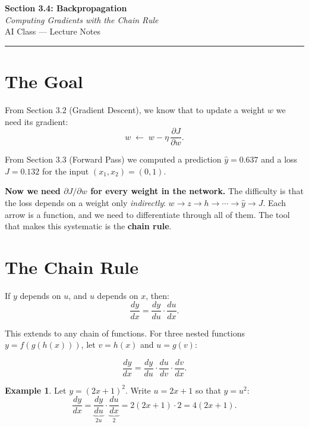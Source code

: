 \documentclass[12pt, a4paper]{article}
\newif\ifstudentmode
\newcommand{\sol}[2][6cm]{%
  \ifstudentmode
    \underline{\hspace{#1}}%
  \else
    {#2}%
  \fi
}
\theoremstyle{definition}
\newtheorem{example}{Example}[section]
\newcommand{\yhat}{\hat{y}}
\newcommand{\pd}[2]{\dfrac{\partial #1}{\partial #2}}
\begin{document}
\begin{center}
  {\LARGE \textbf{Section 3.4: Backpropagation}} \\[0.3em]
  {\large\itshape Computing Gradients with the Chain Rule} \\[0.5em]
  {\large AI Class --- Lecture Notes}%
  \ifstudentmode
    \quad {\normalsize\color{gray}[Student Copy]}%
  \fi
\end{center}

\vspace{1em}
\hrule
\vspace{1.5em}

\section{The Goal}

From Section 3.2 (Gradient Descent), we know that to update a weight $w$
we need its gradient:
\[
  w \;\longleftarrow\; w - \eta \,\pd{J}{w}.
\]

From Section 3.3 (Forward Pass) we computed a prediction $\yhat = 0.637$
and a loss $J = 0.132$ for the input $(x_1, x_2) = (0, 1)$.

\textbf{Now we need $\partial J / \partial w$ for every weight in the
network.}
The difficulty is that the loss depends on a weight only \emph{indirectly}:
$w \to z \to h \to \cdots \to \yhat \to J$.
Each arrow is a function, and we need to differentiate through all of them.
The tool that makes this systematic is the \textbf{chain rule}.

\section{The Chain Rule}

If $y$ depends on $u$, and $u$ depends on $x$, then:
\[
  \frac{dy}{dx} = \frac{dy}{du} \cdot \frac{du}{dx}.
\]

This extends to any chain of functions.
For three nested functions $y = f(g(h(x)))$, let $v = h(x)$ and $u = g(v)$:

\[
  \frac{dy}{dx}
  = \frac{dy}{du} \cdot \frac{du}{dv} \cdot \frac{dv}{dx}.
\]

\begin{example}
Let $y = (2x+1)^2$.  Write $u = 2x+1$ so that $y = u^2$:
\[
  \frac{dy}{dx}
  = \underbrace{\frac{dy}{du}}_{2u}
    \cdot
    \underbrace{\frac{du}{dx}}_{2}
  = 2(2x+1) \cdot 2
  = \sol[4cm]{4(2x+1)}.
\]
\end{example}
\end{document}
